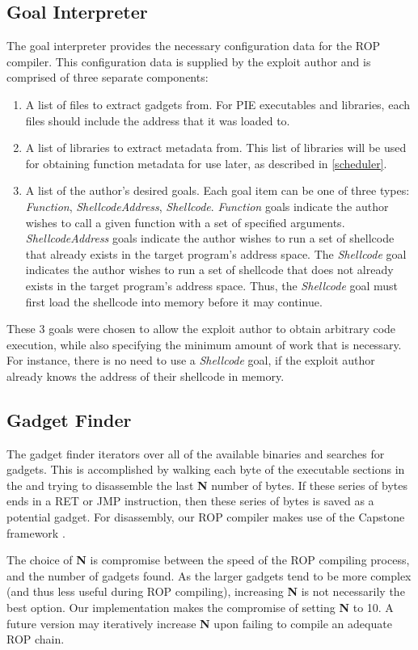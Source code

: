 \documentclass[journal]{IEEEtran}
\begin{document}
\subsection{Goal Interpreter}
The goal interpreter provides the necessary configuration data for the ROP compiler.
This configuration data is supplied by the exploit author and is comprised of three separate components:
\begin{enumerate}
  \item A list of files to extract gadgets from.  For PIE executables and libraries, each files should include the address that it was loaded to.
  \item A list of libraries to extract metadata from.  This list of libraries will be used for obtaining function metadata for use later, as described in \ref{scheduler}.
  \item A list of the author's desired goals.  Each goal item can be one of three types: \emph{Function}, \emph{ShellcodeAddress}, \emph{Shellcode}.
  \emph{Function} goals indicate the author wishes to call a given function with a set of specified arguments.  
  \emph{ShellcodeAddress} goals indicate the author wishes to run a set of shellcode that already exists in the target program's address space.
  The \emph{Shellcode} goal indicates the author wishes to run a set of shellcode that does not already exists in the target program's address space.
  Thus, the \emph{Shellcode} goal must first load the shellcode into memory before it may continue.
\end{enumerate}
These 3 goals were chosen to allow the exploit author to obtain arbitrary code execution, while also specifying the minimum amount of work that is necessary.
For instance, there is no need to use a \emph{Shellcode} goal, if the exploit author already knows the address of their shellcode in memory.

\subsection{Gadget Finder}
The gadget finder iterators over all of the available binaries and searches for gadgets.
This is accomplished by walking each byte of the executable sections in the and trying to disassemble the last \textbf{N} number of bytes.
If these series of bytes ends in a RET or JMP instruction, then these series of bytes is saved as a potential gadget.
For disassembly, our ROP compiler makes use of the Capstone framework \cite{capstone}.

The choice of \textbf{N} is compromise between the speed of the ROP compiling process, and the number of gadgets found.
As the larger gadgets tend to be more complex (and thus less useful during ROP compiling), increasing \textbf{N} is not necessarily the best option.
Our implementation makes the compromise of setting \textbf{N} to 10.
A future version may iteratively increase \textbf{N} upon failing to compile an adequate ROP chain.
\end{document}
